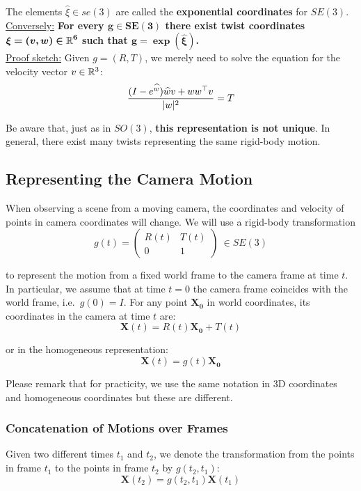 The elements $\widehat{\xi} \in se(3)$ are called the
\textbf{exponential coordinates} for $SE(3)$.\\

\underline{Conversely:} \textbf{For every $\bm{g \in SE(3)}$ there exist
twist coordinates $\bm{\xi = (v,w) \in \mathbb{R}^6}$ such that $\bm{g=\exp(\widehat{\xi})}$.}\\

\underline{Proof sketch:} Given $g = (R,T)$, we merely need to solve the equation
for the velocity vector $v \in \mathbb{R}^3$:
	\[\frac{(I-e^{\widehat{w}})\widehat{w}v + ww^{\top}v}{|w|^2} = T\]


Be aware that, just as in $SO(3)$, \textbf{this representation is not unique}.
In general, there exist many twists representing the same rigid-body motion.


\subsection{Representing the Camera Motion}%
\label{sub:representing_the_camera_motion}

When observing a scene from a moving camera, the coordinates and velocity
of points in camera coordinates will change. We will use a rigid-body transformation
	\[g(t) = \begin{pmatrix}
		R(t) & T(t) \\
		0 & 1
	\end{pmatrix}\ \in SE(3)\]

to represent the motion from a fixed world frame to the camera frame at time $t$.
In particular, we assume that at time $t=0$ the camera frame coincides with the
world frame, i.e.\ $g(0)=I$.
For any point $\bm{X_0}$ in world coordinates,
its coordinates in the camera at time $t$ are:
	\[\bm{X}(t) = R(t)\bm{X_0} + T(t)\]

or in the homogeneous representation:
	\[\bm{X}(t) = g(t)\bm{X_0}\]

Please remark that for practicity, we use the same notation
in 3D coordinates and homogeneous coordinates but these are different.


\subsubsection{Concatenation of Motions over Frames}%
\label{ssub:concatenation_of_motions_over_frames}

Given two different times $t_1$ and $t_2$, we denote the transformation from
the points in frame $t_1$ to the points in frame $t_2$ by $g(t_2,t_1)$:
	\[\bm{X}(t_2) = g(t_2,t_1) \bm{X}(t_1)\]

